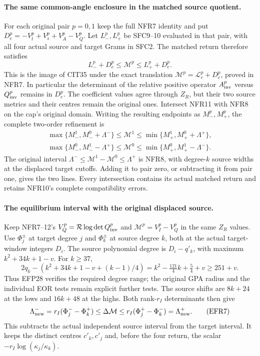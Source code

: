 \documentclass[11pt,a4paper]{article}
\begin{document}
\paragraph{The same common-angle enclosure in the matched source quotient.}
For each original pair $p=0,1$ keep the full NFR7 identity and put
$D_e^p=-V_t^p+V_s^p+V_A^p-V_Q^p$.
Let $L_-^p,L_+^p$ be SFC9--10 evaluated in that pair, with all
four actual source and target Grams in SFC2.
The matched return therefore satisfies
\[
 L_-^p+D_e^p\le\mathcal M^p\le L_+^p+D_e^p .
 \tag{NFR11}
\]
This is the image of CIT35 under the exact translation
$\mathcal M^p=\mathcal L_e^p+D_e^p$, proved in NFR7.
In particular the determinant of the relative positive operator
$A_{\rm inv}^p$ versus $Q_{\rm inv}^p$ remains in $D_e^p$.
The coefficient values agree through $Z_R$, but their two
source metrics and their centres remain the original ones.
Intersect NFR11 with NFR8 on the cap's original domain.
Writing the resulting endpoints as $M_-^p,M_+^p$, the complete
two-order refinement is
\[
 \begin{gathered}
 \max\{M_-^1,M_-^0+\Lambda^-\}\le\mathcal M^1
       \le\min\{M_+^1,M_+^0+\Lambda^+\},\\
 \max\{M_-^0,M_-^1-\Lambda^+\}\le\mathcal M^0
       \le\min\{M_+^0,M_+^1-\Lambda^-\}.
 \end{gathered}\tag{NFR12}
\]
The original interval $\Lambda^-\le\mathcal M^1-\mathcal M^0
\le\Lambda^+$ is NFR8, with degree-$k$ source widths at the
displaced target cutoffs. Adding it to pair zero, or subtracting
it from pair one, gives the two lines. Every intersection
contains its actual matched return and retains NFR10's
complete compatibility errors.


\paragraph{The equilibrium interval with the original displaced source.}
Keep NFR7--12's $V_Q^p=\mathcal R\log\det Q_{\rm inv}^p$ and
$\mathcal M^p=V_I^p-V_Q^p$ in the same $Z_R$ values.
Use $\Phi_j^\pm$ at target degree $j$ and $\Phi_k^\pm$ at source
degree $k$, both at the actual target-window integers $D_i$.
The source polynomial degree is $D_i-q'_k$, with maximum
$k^2+34k+1-v$. For $k\ge37$,
\[
2q_k-(k^2+34k+1-v+(k-1)/4)
 =k^2-\tfrac{121}4k+\tfrac54+v\ge251+v .
\]
Thus EFP28 verifies the required degree range; the original GPA
radius and the individual EOR tests remain explicit further tests.
The source shifts are $8k+24$ at the lows and $16k+48$ at the highs.
Both rank-$r_I$ determinants then give
\[
\Lambda_{\rm new}^-=r_I(\Phi_j^--\Phi_k^+)
 \le\Delta\mathcal M\le
 r_I(\Phi_j^+-\Phi_k^-)=\Lambda_{\rm new}^+.
\tag{EFR7}
\]
This subtracts the actual independent source interval from the
target interval. It keeps the distinct centres $c'_k,c'_j$ and,
before the four return, the scalar $-r_I\log(\kappa_j/\kappa_k)$.
\end{document}
